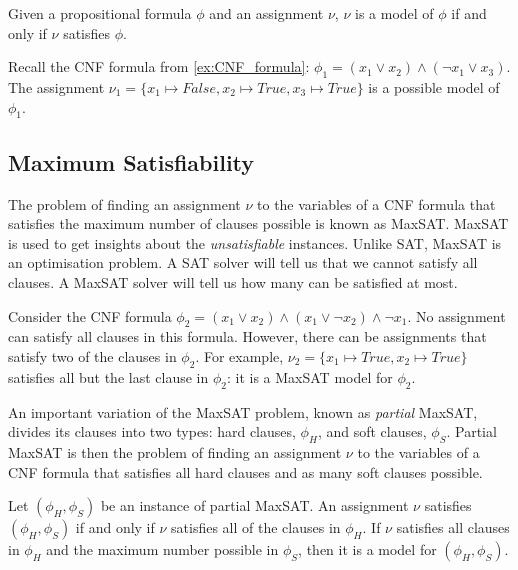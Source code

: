 \begin{definition}[Model]
Given a propositional formula  \(\phi\) and an assignment \(\nu\), \(\nu\) is a model of \(\phi\) if and only if \(\nu\) satisfies \(\phi\).
\end{definition}

\begin{example}
Recall the \ac{CNF} formula from \autoref{ex:CNF_formula}: \(\phi_1 = (x_1 \lor x_2) \land (\neg x_1 \lor x_3)\). The assignment \(\nu_1 = \{x_1 \mapsto \textit{False}, x_2 \mapsto \textit{True}, x_3 \mapsto \textit{True}\}\) is a possible model of \(\phi_1\).
\end{example}

\subsection{Maximum Satisfiability}
The problem of finding an assignment \(\nu\) to the variables of a CNF formula that satisfies the maximum number of clauses possible is known as \ac{MaxSAT}.
\ac{MaxSAT} is used to get insights about the \textit{unsatisfiable} instances.
Unlike \ac{SAT}, \ac{MaxSAT} is an optimisation problem.
A \ac{SAT} solver will tell us that we cannot satisfy all clauses. A \ac{MaxSAT} solver will tell us how many can be satisfied at most.

\begin{example}\label{ex:MaxSAT}
Consider the \ac{CNF} formula \(\phi_2 = (x_1 \lor x_2) \land (x_1 \lor \neg x_2) \land \neg x_1\).
No assignment can satisfy all clauses in this formula. 
However, there can be assignments that satisfy two of the clauses in \(\phi_2\).
For example, \(\nu_2 = \{x_1 \mapsto \textit{True}, x_2 \mapsto \textit{True}\}\) satisfies all but the last clause in \(\phi_2\): it is a \ac{MaxSAT} model for \(\phi_2\).
\end{example}

\noindent
An important variation of the \ac{MaxSAT} problem, known as \textit{partial} \ac{MaxSAT}, divides its clauses into two types: hard clauses, \(\phi_H\), and soft clauses, \(\phi_S\).
Partial \ac{MaxSAT} is then the problem of finding an assignment \(\nu\) to the variables of a \ac{CNF} formula that satisfies all hard clauses and as many soft clauses possible.

\begin{definition}[Model]
Let \((\phi_H, \phi_S)\) be an instance of partial \ac{MaxSAT}. An assignment \(\nu\) satisfies \((\phi_H, \phi_S)\) if and only if \(\nu\) satisfies all of the clauses in \(\phi_H\). If \(\nu\) satisfies all clauses in \(\phi_H\) and the maximum number possible in \(\phi_S\), then it is a model for \((\phi_H, \phi_S)\).
\end{definition}

